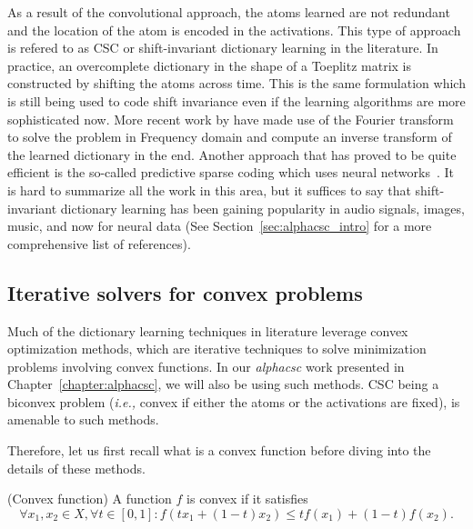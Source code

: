 As a result of the convolutional approach, the atoms learned are not redundant and the location of the atom is encoded in the activations. This type of approach is refered to as \ac{CSC} or shift-invariant dictionary learning in the literature. In practice, an overcomplete dictionary in the shape of a Toeplitz matrix is constructed by shifting the atoms across time. This is the same formulation which is still being used to code shift invariance even if the learning algorithms are more sophisticated now. More recent work by \cite{grosse2012shift} have made use of the Fourier transform to solve the problem in Frequency domain and compute an inverse transform of the learned dictionary in the end. Another approach that has proved to be quite efficient is the so-called predictive sparse coding which uses neural networks~\citep{kavukcuoglu2010learning}. It is hard to summarize all the work in this area, but it suffices to say that shift-invariant dictionary learning has been gaining popularity in audio signals, images, music, and now for neural data (See Section~\ref{sec:alphacsc_intro} for a more comprehensive list of references).

\subsection{Iterative solvers for convex problems}

Much of the dictionary learning techniques in literature leverage convex optimization methods, which are iterative techniques to solve minimization problems involving convex functions. In our \emph{alphacsc} work presented in Chapter~\ref{chapter:alphacsc}, we will also be using such methods. \ac{CSC} being a biconvex problem (\textit{i.e.,}  convex if either the atoms or the activations are fixed), is amenable to such methods.

Therefore, let us first recall what is a convex function before diving into the details of these methods.
\vspace{\parskip}
\begin{definition}{(Convex function)}
\label{def:convexity}
A function $f$ is convex if it satisfies
\begin{equation}
\forall x_1, x_2 \in X, \forall t \in [0, 1]: f(tx_1 + (1 - t)x_2) \leq tf(x_1) + (1 - t)f(x_2).
\end{equation}
\end{definition}

